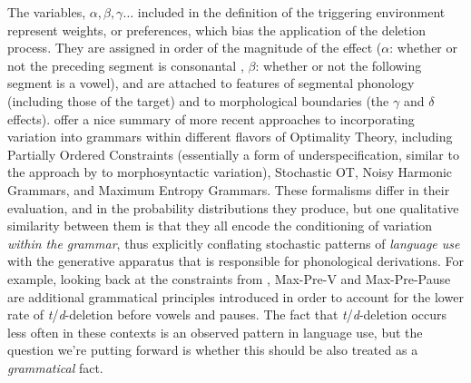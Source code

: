 The variables, $\alpha, \beta, \gamma \ldots$ included in the definition of the triggering environment represent weights, or preferences, which bias the application of the deletion process. 
They are assigned in order of the magnitude of the effect ($\alpha$: whether or not the preceding segment is consonantal%
,
$\beta$: whether or not the following segment is a vowel), and are attached to features of segmental phonology (including those of the target) and to morphological boundaries (the $\gamma$ and $\delta$ effects).
\citet{Coetzee2011} offer a nice summary of more recent approaches to incorporating variation into grammars within different flavors of Optimality Theory, including Partially Ordered Constraints (essentially a form of underspecification, similar to the approach by \citet{adger2006} to morphosyntactic variation), Stochastic OT, Noisy Harmonic Grammars, and Maximum Entropy Grammars.
These formalisms differ in their evaluation, and in the probability distributions they produce, but one qualitative similarity between them is that they all encode the conditioning of variation \emph{within the grammar}, thus explicitly conflating stochastic patterns of \textsl{language use} with the generative apparatus that is responsible for phonological derivations.
For example, looking back at the constraints from \citet{Coetzee2012}, {\sc Max-Pre-V} and {\sc Max-Pre-Pause} are additional grammatical principles introduced in order to account for the lower rate of {\sl t}/{\sl d}-deletion before vowels and pauses.
The fact that {\sl t}/{\sl d}-deletion occurs less often in these contexts is an observed pattern in language use, but the question we're putting forward is whether this should be also treated as a \emph{grammatical} fact.

